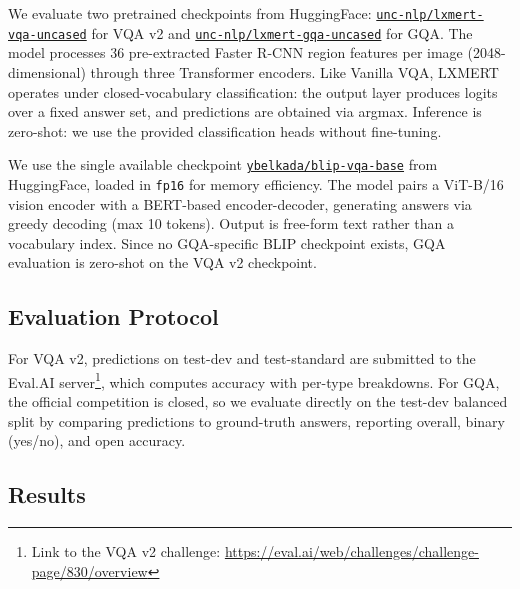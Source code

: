 We evaluate two pretrained checkpoints from HuggingFace: \href{https://huggingface.co/unc-nlp/lxmert-vqa-uncased}{\texttt{unc-nlp/lxmert-vqa-uncased}} for VQA v2 and \href{https://huggingface.co/unc-nlp/lxmert-gqa-uncased}{\texttt{unc-nlp/lxmert-gqa-uncased}} for GQA. The model processes 36 pre-extracted Faster R-CNN region features per image (2048-dimensional) through three Transformer encoders. Like Vanilla VQA, LXMERT operates under closed-vocabulary classification: the output layer produces logits over a fixed answer set, and predictions are obtained via argmax. Inference is zero-shot: we use the provided classification heads without fine-tuning.

 We use the single available checkpoint \href{https://huggingface.co/ybelkada/blip-vqa-base}{\texttt{ybelkada/blip-vqa-base}} from HuggingFace, loaded in \texttt{fp16} for memory efficiency. The model pairs a ViT-B/16 vision encoder with a BERT-based encoder-decoder, generating answers via greedy decoding (max 10 tokens). Output is free-form text rather than a vocabulary index. Since no GQA-specific BLIP checkpoint exists, GQA evaluation is zero-shot on the VQA v2 checkpoint.

\subsection{Evaluation Protocol}

For VQA v2, predictions on test-dev and test-standard are submitted to the Eval.AI server\footnote{Link to the VQA v2 challenge: \url{https://eval.ai/web/challenges/challenge-page/830/overview}}, which computes accuracy with per-type breakdowns. For GQA, the official competition is closed, so we evaluate directly on the test-dev balanced split by comparing predictions to ground-truth answers, reporting overall, binary (yes/no), and open accuracy.

\subsection{Results}

